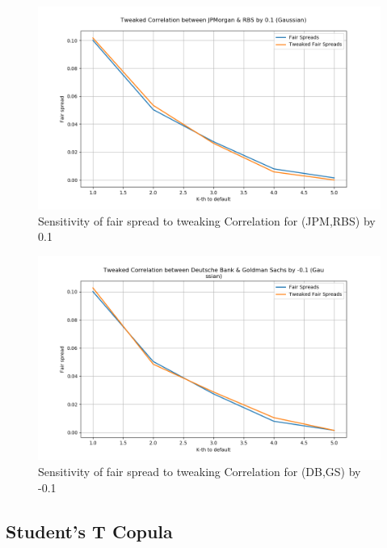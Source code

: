 \documentclass{report}
\theoremstyle{plain}
\theoremstyle{definition}
\begin{document}
\begin{figure}[H]
	\begin{center}
		\includegraphics[width=15cm]{Tweaked_Correlation_between_JPMorgan_&_RBS_by_0,1_(Gaussian).png}
		\caption{Sensitivity of fair spread to tweaking Correlation for (JPM,RBS) by 0.1} 
		\label{Tweaked_Correlation_between_JPMorgan_&_RBS_by_0.1_(Gaussian)}
	\end{center}
\end{figure}

\begin{figure}[H]
	\begin{center}
		\includegraphics[width=15cm]{Tweaked_Correlation_between_Deutsche_Bank_&_Goldman_Sachs_by_-0,1_(Gaussian).png}
		\caption{Sensitivity of fair spread to tweaking Correlation for (DB,GS) by -0.1} 
		\label{Tweaked_Correlation_between_Deutsche_Bank_&_Goldman_Sachs_by_-0.1_(Gaussian)}
	\end{center}
\end{figure}


\subsection{Student's T Copula}
\end{document}
